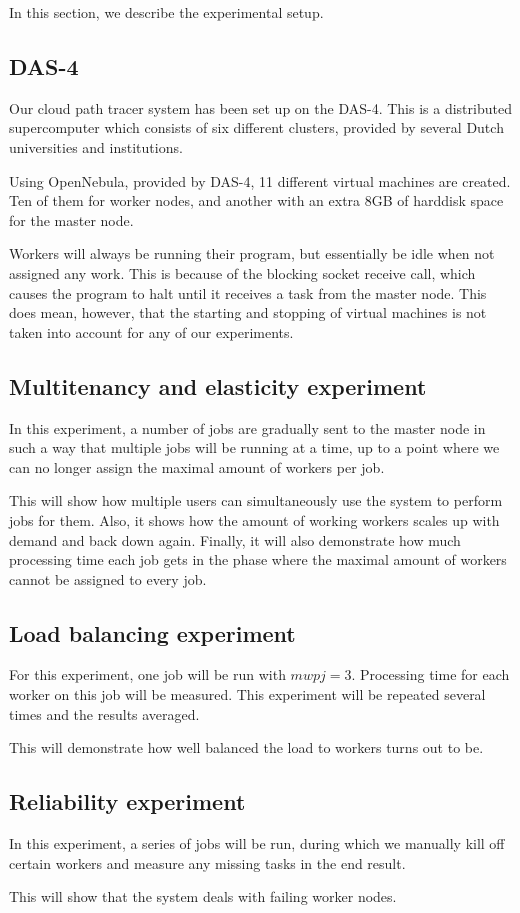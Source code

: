 In this section, we describe the experimental setup.

\subsection{DAS-4}
Our cloud path tracer system has been set up on the DAS-4\cite{das4}.
This is a distributed supercomputer which consists of six different clusters, provided by several Dutch universities and institutions.

Using OpenNebula, provided by DAS-4, 11 different virtual machines are created.
Ten of them for worker nodes, and another with an extra 8GB of harddisk space for the master node.

Workers will always be running their program, but essentially be idle when not assigned any work.
This is because of the blocking socket receive call, which causes the program to halt until it receives a task from the master node.
This does mean, however, that the starting and stopping of virtual machines is not taken into account for any of our experiments.

\subsection{Multitenancy and elasticity experiment}
In this experiment, a number of jobs are gradually sent to the master node in such a way that multiple jobs will be running at a time, up to a point where we can no longer assign the maximal amount of workers per job.

This will show how multiple users can simultaneously use the system to perform jobs for them.
Also, it shows how the amount of working workers scales up with demand and back down again.
Finally, it will also demonstrate how much processing time each job gets in the phase where the maximal amount of workers cannot be assigned to every job.

\subsection{Load balancing experiment}
For this experiment, one job will be run with $mwpj = 3$.
Processing time for each worker on this job will be measured.
This experiment will be repeated several times and the results averaged.

This will demonstrate how well balanced the load to workers turns out to be.

\subsection{Reliability experiment}
In this experiment, a series of jobs will be run, during which we manually kill off certain workers and measure any missing tasks in the end result.

This will show that the system deals with failing worker nodes.